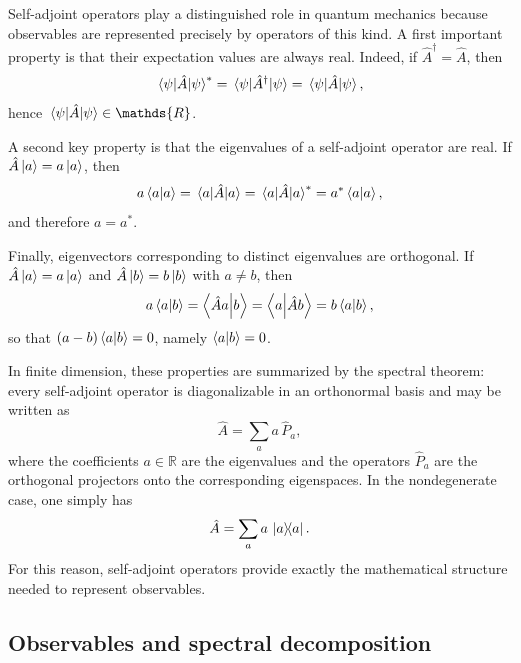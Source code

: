 Self-adjoint operators play a distinguished role in quantum mechanics because observables are represented precisely by operators of this kind. A first important property is that their expectation values are always real. Indeed, if $\hat A^\dagger=\hat A$, then
\begin{equation}
	\matrixel{\psi}{\hat A}{\psi}^*
	=
	\matrixel{\psi}{\hat A^\dagger}{\psi}
	=
	\matrixel{\psi}{\hat A}{\psi},
	\label{eq:intro_qm_selfadjoint_real_expectation_value}
\end{equation}
hence $\matrixel{\psi}{\hat A}{\psi}\in\mathds{R}$.

A second key property is that the eigenvalues of a self-adjoint operator are real. If $\hat A\ket{a}=a\ket{a}$, then
\begin{equation}
	a\braket{a}{a}
	=
	\matrixel{a}{\hat A}{a}
	=
	\matrixel{a}{\hat A}{a}^*
	=
	a^*\braket{a}{a},
	\label{eq:intro_qm_selfadjoint_eigenvalues_real}
\end{equation}
and therefore $a=a^*$.

Finally, eigenvectors corresponding to distinct eigenvalues are orthogonal. If $\hat A\ket{a}=a\ket{a}$ and $\hat A\ket{b}=b\ket{b}$ with $a\neq b$, then
\begin{equation}
	a\braket{a}{b}
	=
	\braket{\hat A a}{b}
	=
	\braket{a}{\hat A b}
	=
	b\braket{a}{b},
	\label{eq:intro_qm_selfadjoint_orthogonality}
\end{equation}
so that $(a-b)\braket{a}{b}=0$, namely $\braket{a}{b}=0$.

In finite dimension, these properties are summarized by the spectral theorem: every self-adjoint operator is diagonalizable in an orthonormal basis and may be written as
\begin{equation}
	\hat A=\sum_a a\,\hat P_a,
	\label{eq:intro_qm_selfadjoint_spectral_theorem}
\end{equation}
where the coefficients $a\in\mathds{R}$ are the eigenvalues and the operators $\hat P_a$ are the orthogonal projectors onto the corresponding eigenspaces. In the nondegenerate case, one simply has
\begin{equation}
	\hat A=\sum_a a\,\dyad{a}{a}.
	\label{eq:intro_qm_selfadjoint_nondegenerate_spectral_theorem}
\end{equation}
For this reason, self-adjoint operators provide exactly the mathematical structure needed to represent observables.

\subsection{Observables and spectral decomposition}

